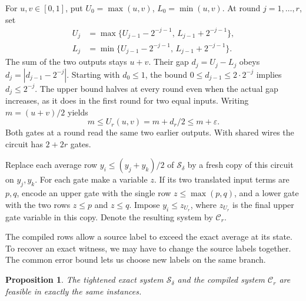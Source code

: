 \documentclass[11pt,letterpaper]{article}
\newtheorem{proposition}[theorem]{Proposition}
\newcommand{\sys}{\mathcal S}
\newcommand{\compiled}{\mathcal C}
\begin{document}
For \(u,v\in[0,1]\), put \(U_0=\max(u,v)\), \(L_0=\min(u,v)\). At round
\(j=1,\ldots,r\), set
\[
 \begin{aligned}
  U_j&=\max\{U_{j-1}-2^{-j-1},\,L_{j-1}+2^{-j-1}\},\\
  L_j&=\min\{U_{j-1}-2^{-j-1},\,L_{j-1}+2^{-j-1}\}.
 \end{aligned}
\]
The sum of the two outputs stays \(u+v\). Their gap \(d_j=U_j-L_j\) obeys
\(d_j=|d_{j-1}-2^{-j}|\). Starting with \(d_0\le1\), the bound
\(0\le d_{j-1}\le2\cdot 2^{-j}\) implies \(d_j\le2^{-j}\). The upper bound
halves at every round even when the actual gap increases, as it does in the
first round for two equal inputs. Writing \(m=(u+v)/2\) yields
\begin{equation}\label{eq:circuit}
                 m\le U_r(u,v)=m+d_r/2\le m+\varepsilon .
\end{equation}
Both gates at a round read the same two earlier outputs. With shared wires the
circuit has \(2+2r\) gates.

Replace each average row \(y_i\le(y_j+y_k)/2\) of \(\sys_\delta\) by a fresh
copy of this circuit on \(y_j,y_k\). For each gate make a variable \(z\).
If its two translated input terms are \(p,q\), encode an upper gate with the
single row \(z\le\max(p,q)\), and a lower gate with the two rows \(z\le p\)
and \(z\le q\). Impose \(y_i\le z_{U_r}\), where \(z_{U_r}\) is the final upper
gate variable in this copy. Denote the resulting system by \(\compiled_r\).

The compiled rows allow a source label to exceed the exact average at its state.
To recover an exact witness, we may have to change the source labels together.
The common error bound lets us choose new labels on the same branch.

\begin{proposition}\label{prop:compile}
The tightened exact system \(\sys_\delta\) and the compiled system
\(\compiled_r\) are feasible in exactly the same instances.
\end{proposition}
\end{document}
